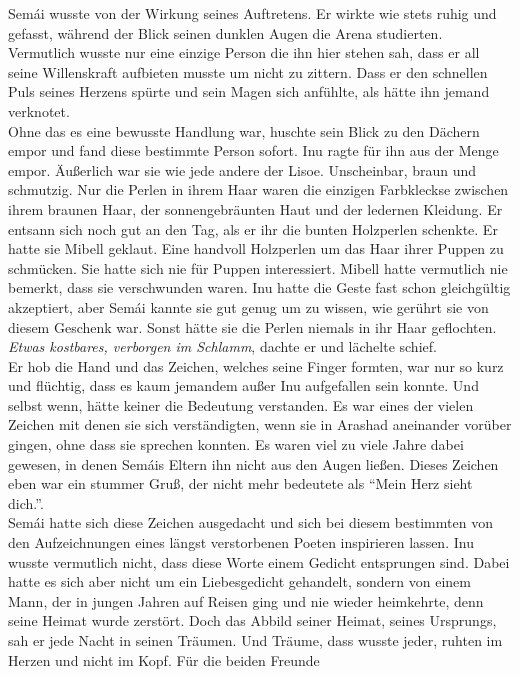 Semái wusste von der Wirkung seines Auftretens. Er wirkte wie stets ruhig und gefasst, während der 
Blick seinen dunklen Augen die Arena studierten. Vermutlich wusste nur eine einzige Person die ihn 
hier stehen sah, dass er all seine Willenskraft aufbieten musste um nicht zu zittern. Dass er den 
schnellen Puls seines Herzens spürte und sein Magen sich anfühlte, als hätte ihn jemand 
verknotet.\\
Ohne das es eine bewusste Handlung war, huschte sein Blick zu den Dächern empor und fand diese 
bestimmte Person sofort. Inu ragte für ihn aus der Menge empor. Äußerlich war sie wie jede andere 
der Lisoe. Unscheinbar, braun und schmutzig. Nur die Perlen in ihrem Haar waren die einzigen 
Farbkleckse zwischen ihrem braunen Haar, der sonnengebräunten Haut und der ledernen Kleidung. Er 
entsann sich noch gut an den Tag, als er ihr die bunten Holzperlen schenkte. Er hatte sie Mibell 
geklaut. Eine handvoll Holzperlen um das Haar ihrer Puppen zu schmücken. Sie hatte sich nie für 
Puppen interessiert. Mibell hatte vermutlich nie bemerkt, dass sie verschwunden waren. Inu 
hatte die Geste fast schon gleichgültig akzeptiert, aber Semái kannte sie gut genug um zu wissen, 
wie gerührt sie von diesem Geschenk war. Sonst hätte sie die Perlen niemals in ihr Haar 
geflochten.\\
\textit{Etwas kostbares, verborgen im Schlamm}, dachte er und lächelte schief.\\
Er hob die Hand und das Zeichen, welches seine Finger formten, war nur so kurz und flüchtig, dass 
es kaum jemandem außer Inu aufgefallen sein konnte. Und selbst wenn, hätte keiner die Bedeutung 
verstanden. Es war eines der vielen Zeichen mit denen sie sich verständigten, wenn sie in Arashad 
aneinander vorüber gingen, ohne dass sie sprechen konnten. Es waren viel zu viele Jahre dabei 
gewesen, in denen Semáis Eltern ihn nicht aus den Augen ließen. Dieses Zeichen eben war ein stummer 
Gruß, der nicht mehr bedeutete als ``Mein Herz sieht dich.''. \\
Semái hatte sich diese Zeichen ausgedacht und sich bei diesem bestimmten von den Aufzeichnungen 
eines längst verstorbenen Poeten inspirieren lassen. Inu wusste vermutlich nicht, dass diese Worte 
einem Gedicht entsprungen sind. Dabei hatte es sich aber nicht um ein Liebesgedicht gehandelt, 
sondern von einem Mann, der in jungen Jahren auf Reisen ging und nie wieder heimkehrte, denn seine 
Heimat wurde zerstört. Doch das Abbild seiner Heimat, seines Ursprungs, sah er jede Nacht in seinen 
Träumen. Und Träume, dass wusste jeder, ruhten im Herzen und nicht im Kopf. Für die beiden Freunde 
